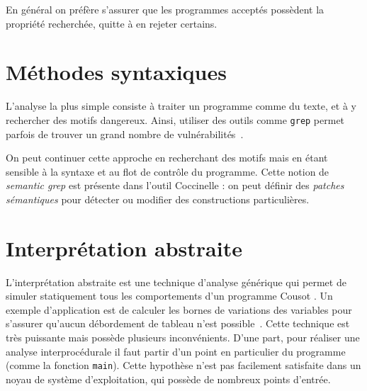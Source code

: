En général on préfère s'assurer que les programmes acceptés possèdent la
propriété recherchée, quitte à en rejeter certains.

\section{Méthodes syntaxiques}

L'analyse la plus simple consiste à traiter un programme comme du texte, et à y
rechercher des motifs dangereux. Ainsi, utiliser des outils comme \texttt{grep}
permet parfois de trouver un grand nombre de vulnérabilités~\cite{SpenderGrep}.

On peut continuer cette approche en recherchant des motifs mais en étant
sensible à la syntaxe et au flot de contrôle du programme. Cette notion de
\emph{semantic grep} est présente dans l'outil Coccinelle
\cite{coccinelle09,coccinelle11} : on peut définir des
\emph{patches sémantiques} pour détecter ou modifier des constructions
particulières.


\section{Interprétation abstraite}

L'interprétation abstraite est une technique d'analyse générique qui permet de
simuler statiquement tous les comportements d'un programme Cousot
\cite{Cousot77,Cousot92-1}. Un exemple d'application est de calculer les bornes
de variations des variables pour s'assurer qu'aucun débordement de tableau n'est
possible~\cite{AllamigeonHymansSSTIC07}. Cette technique est très puissante mais
possède plusieurs inconvénients. D'une part, pour réaliser une analyse
interprocédurale il faut partir d'un point en particulier du programme (comme la
fonction \texttt{main}). Cette hypothèse n'est pas facilement satisfaite dans un
noyau de système d'exploitation, qui possède de nombreux points d'entrée.


